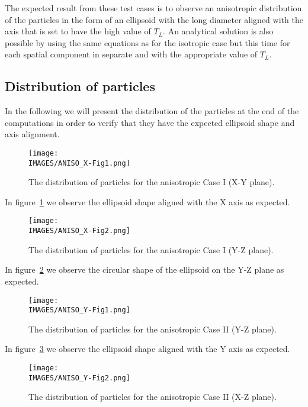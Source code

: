 The expected result from these test cases is to observe an anisotropic distribution of the particles in the form of an ellipsoid with the long diameter aligned with the axis that is set to have the high value of $T_L$. An analytical solution is also possible by using the same equations as for the isotropic case but this time for each spatial component in separate and with the appropriate value of $T_L$.

\subsection{Distribution of particles}
In the following we will present the distribution of the particles at the end of the computations in order to verify that they have the expected ellipsoid shape and axis alignment.

\begin{figure}[H]
    \centering
    \texttt{[image: \\IMAGES/ANISO\_X-Fig1.png]}
    \caption{The distribution of particles for the anisotropic Case I (X-Y plane).}
    \label{Fig_ANISO_X_Fig1}
\end{figure}

In figure~\ref{Fig_ANISO_X_Fig1} we observe the ellipsoid shape aligned with the X axis as expected.

\begin{figure}[H]
    \centering
    \texttt{[image: \\IMAGES/ANISO\_X-Fig2.png]}
    \caption{The distribution of particles for the anisotropic Case I (Y-Z plane).}
    \label{Fig_ANISO_X_Fig2}
\end{figure}

In figure~\ref{Fig_ANISO_X_Fig2} we observe the circular shape of the ellipsoid on the Y-Z plane as expected.

\begin{figure}[H]
    \centering
    \texttt{[image: \\IMAGES/ANISO\_Y-Fig1.png]}
    \caption{The distribution of particles for the anisotropic Case II (Y-Z plane).}
    \label{Fig_ANISO_Y_Fig1}
\end{figure}

In figure~\ref{Fig_ANISO_Y_Fig1} we observe the ellipsoid shape aligned with the Y axis as expected.

\begin{figure}[H]
    \centering
    \texttt{[image: \\IMAGES/ANISO\_Y-Fig2.png]}
    \caption{The distribution of particles for the anisotropic Case II (X-Z plane).}
    \label{Fig_ANISO_Y_Fig2}
\end{figure}

